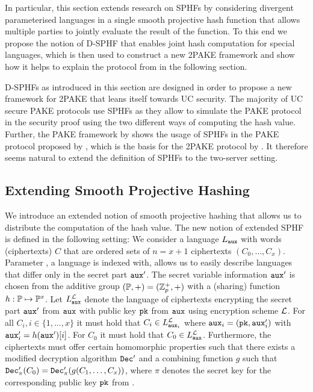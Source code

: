 In particular, this section extends research on \aclp{SPHF} by considering divergent parameterised languages in a single smooth projective hash function that allows multiple parties to jointly evaluate the result of the function. 
To this end we propose the notion of \ac{D-SPHF} that enables joint hash computation for special languages, which is then used to construct a new \ac{2PAKE} framework and show how it helps to explain the protocol from \citet{Katz2012a} in the following section.

\aclp{D-SPHF} as introduced in this section are designed in order to propose a new framework for \ac{2PAKE} that leans itself towards \ac{UC} security.
The majority of \ac{UC} secure \ac{PAKE} protocols use \acp{SPHF} as they allow to simulate the \ac{PAKE} protocol in the security proof using the two different ways of computing the hash value.
Further, the \ac{PAKE} framework by \citet{Gennaro2003} shows the usage of \acp{SPHF} in the \ac{PAKE} protocol proposed by \citet{KatzOY01}, which is the basis for the \ac{2PAKE} protocol by \citet{Katz2012a}.
It therefore seems natural to extend the definition of \acp{SPHF} to the two-server setting.

\subsection{Extending Smooth Projective Hashing}\label{sec:sphff}
We introduce an extended notion of smooth projective hashing that allows us to distribute the computation of the hash value.
The new notion of extended \ac{SPHF} is defined in the following setting:
We consider a language $L_\mathtt{aux}$ with words (ciphertexts) $C$ that are ordered sets of $n=x+1$ ciphertexts $(C_0,\dots,C_x)$.
Parameter \aux, a language is indexed with, allows us to easily describe languages that differ only in the secret part $\mathtt{aux}'$.
The secret variable information $\mathtt{aux}'$ is chosen from the additive group $(\mathbb{P},+)=(\mathbb{Z}_p^{+},+)$ with a (sharing) function $h:\mathbb{P}\mapsto\mathbb{P}^x$.
Let $L^\mathcal{L}_\mathtt{aux}$ denote the language of ciphertexts encrypting the secret part $\mathtt{aux}'$ from $\mathtt{aux}$ with public key $\mathtt{pk}$ from $\mathtt{aux}$ using encryption scheme $\mathcal{L}$.
For all $C_i, i\in\{1,\dots,x\}$ it must hold that $C_i\in L^\mathcal{L}_{\mathtt{aux}_i}$ where $\mathtt{aux}_i=(\mathtt{pk},\mathtt{aux}'_i)$ with $\mathtt{aux}'_i=h(\mathtt{aux}')[i]$.
For $C_0$ it must hold that $C_0\in L^\mathcal{L}_{\mathtt{aux}}$.
Furthermore, the ciphertexts must offer certain homomorphic properties such that there exists a modified decryption algorithm $\mathtt{Dec}'$ and a combining function $g$ such that $\mathtt{Dec}'_{\pi}(C_0)=\mathtt{Dec}'_{\pi}(g(C_1,\dots,C_x))$, where $\pi$ denotes the secret key for the corresponding public key $\mathtt{pk}$ from \crs.

